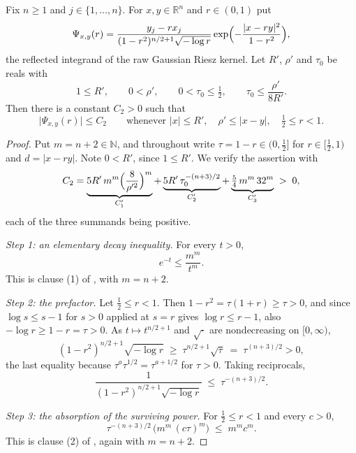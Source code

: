 \begin{lemma}[A constant bound on the singular range $r \in [\tfrac12,1)$, at normalised radii]
Fix $n \geq 1$ and $j \in \{1,\ldots,n\}$.  For $x,y \in \mathbb{R}^n$ and
$r \in (0,1)$ put
\[
  \Psi_{x,y}(r)
    = \frac{y_j - r x_j}{(1-r^2)^{n/2+1}\sqrt{-\log r}}
      \exp\Bigl(-\frac{|x-ry|^2}{1-r^2}\Bigr) ,
\]
the reflected integrand of the raw Gaussian Riesz kernel.  Let $R'$, $\rho'$ and
$\tau_0$ be reals with
\[
  1 \leq R' , \qquad 0 < \rho' , \qquad
  0 < \tau_0 \leq \tfrac12 , \qquad \tau_0 \leq \frac{\rho'}{8R'} .
\]
Then there is a constant $C_2 > 0$ such that
\[
  \bigl|\Psi_{x,y}(r)\bigr| \leq C_2
  \qquad\text{whenever } |x| \leq R',\quad \rho' \leq |x-y|,\quad
  \tfrac12 \leq r < 1 .
\]
\end{lemma}
\begin{proof}
Put $m = n+2 \in \mathbb{N}$, and throughout write $\tau = 1-r \in (0,\tfrac12]$
for $r \in [\tfrac12,1)$ and $d = |x-ry|$.  Note $0 < R'$, since $1 \leq R'$.  We
verify the assertion with
\[
  C_2 = \underbrace{5R'\,m^m\Bigl(\frac{8}{\rho'^2}\Bigr)^{m}}_{C_1'}
    + \underbrace{5R'\,\tau_0^{-(n+3)/2}}_{C_2'}
    + \underbrace{\tfrac54\,m^m\,32^{m}}_{C_3'} \;>\; 0 ,
\]
each of the three summands being positive.

\emph{Step 1: an elementary decay inequality.}
For every $t > 0$,
\begin{equation*}
  e^{-t} \leq \frac{m^m}{t^m} . \tag{1}
\end{equation*}
This is clause (1) of , with
$m = n+2$.

\emph{Step 2: the prefactor.}
Let $\tfrac12 \leq r < 1$.  Then $1-r^2 = \tau(1+r) \geq \tau > 0$, and since
$\log s \leq s-1$ for $s > 0$ applied at $s = r$ gives $\log r \leq r-1$, also
$-\log r \geq 1-r = \tau > 0$.  As $t \mapsto t^{n/2+1}$ and $\sqrt{\cdot}$ are
nondecreasing on $[0,\infty)$,
\[
  (1-r^2)^{n/2+1}\sqrt{-\log r} \;\geq\; \tau^{n/2+1}\sqrt\tau
    \;=\; \tau^{(n+3)/2} > 0 ,
\]
the last equality because $\tau^{a}\tau^{1/2} = \tau^{a+1/2}$ for $\tau > 0$.
Taking reciprocals,
\begin{equation*}
  \frac{1}{(1-r^2)^{n/2+1}\sqrt{-\log r}} \;\leq\; \tau^{-(n+3)/2} . \tag{2}
\end{equation*}

\emph{Step 3: the absorption of the surviving power.}
For $\tfrac12 \leq r < 1$ and every $c > 0$,
\begin{equation*}
  \tau^{-(n+3)/2}\,\bigl(m^m\,(c\tau)^m\bigr) \;\leq\; m^m c^m . \tag{3}
\end{equation*}
This is clause (2) of , again with
$m = n+2$.


\end{proof}
